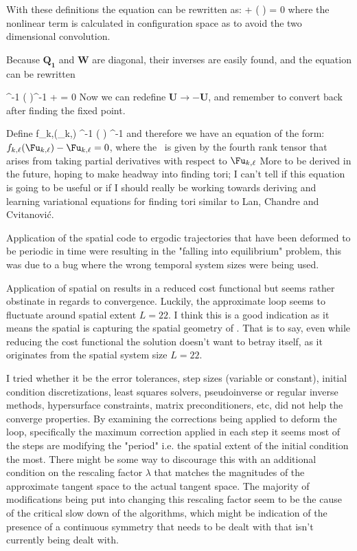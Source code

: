 With these definitions the equation can be rewritten as:
\beq
{}   + ( \otimes {}) = 0
\label{e-FksSpattempMat}
\eeq
where the nonlinear term is calculated in configuration space as to avoid the two dimensional convolution.

Because $\mathbf{Q_1}$ and $\mathbf{W}$ are diagonal, their inverses are easily found, and the equation  can be rewritten

\beq
{}^{-1} ( \otimes {})^{-1} +  = 0
\eeq
Now we can redefine $\mathbf{U} \rightarrow -\mathbf{U}$, and remember to convert
back after finding the fixed point.

Define
\beq
f_{k,\ell}(\Fu_{k,\ell}) \equiv {}^{-1} (  \otimes {})  ^{-1}
\eeq
and therefore we have an equation of the form:
$f_{k,\ell}(\Fu_{k,\ell})-\Fu_{k,\ell} = 0$,
where the \jacobianM\ is given by the fourth rank tensor that arises from taking partial derivatives with
respect to $\Fu_{k,\ell}$
More to be derived in the future, hoping to make headway into finding tori; I can't tell if this equation
is going to be useful or if I should really be working towards deriving and learning variational {\descent}
equations for finding tori similar to Lan, Chandre and Cvitanovi{\'c}.

Application of the spatial {\descent} code to ergodic trajectories that have been deformed to
be periodic in time were resulting in the "falling into equilibrium" problem, this was due to a bug
where the wrong temporal system sizes were being used.

Application of spatial {\descent} on  results in a reduced cost
functional but seems rather obstinate in regards to convergence. Luckily, the
approximate loop seems to fluctuate around spatial extent $L=22$. I think this
is a good indication as it means the spatial {\descent} is capturing the
spatial geometry of . That is to say, even while reducing the cost
functional the solution doesn't want to betray itself, as it originates from
the spatial system size $L=22$.

I tried whether it be the error tolerances, step sizes (variable or constant), initial condition
discretizations, least squares solvers, pseudoinverse or regular inverse methods, hypersurface constraints,
matrix preconditioners, etc, did not help the converge properties.
By examining the corrections being applied to deform the loop, specifically the maximum correction applied
in each step it seems most of the steps are modifying the "period" i.e. the spatial extent of the initial
condition the most. There might be some way to discourage this with an additional condition on the
rescaling factor $\lambda$ that matches the magnitudes of the approximate tangent space to the
actual tangent space.
The majority of modifications being put into changing this rescaling factor seem to be the cause of
the critical slow down of the algorithms, which might be indication of the presence of a continuous
symmetry that needs to be dealt with that isn't currently being dealt with.

